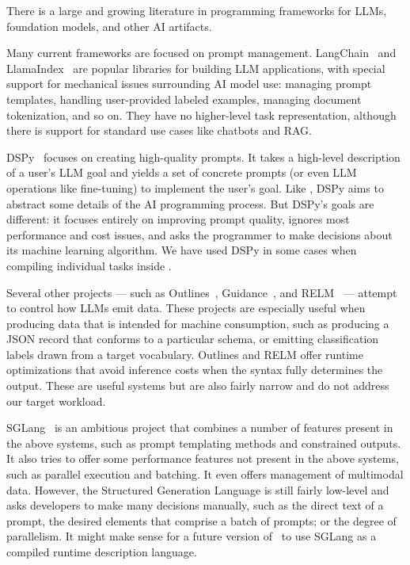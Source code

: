 There is a large and growing literature in programming frameworks for LLMs, foundation models, and other AI artifacts.

Many current frameworks are focused on prompt management. 
LangChain~\cite{langchain} and LlamaIndex~\cite{Liu_LlamaIndex_2022} are popular libraries for building LLM applications, with special support for mechanical issues surrounding AI model use: managing prompt templates, handling user-provided labeled examples, managing document tokenization, and so on. They have no higher-level task representation, although there is support for standard use cases like chatbots and RAG.

DSPy~\cite{dspy} focuses on creating high-quality prompts. It takes a high-level description of a user's LLM goal and yields a set of concrete prompts (or even LLM operations like fine-tuning) to implement the user's goal. Like \system, DSPy aims to abstract some details of the AI programming process. But DSPy's goals are different: it focuses entirely on improving prompt quality, ignores most performance and cost issues, and asks the programmer to make decisions about its machine learning algorithm.  We have used DSPy in some cases when compiling individual tasks inside \system.

Several other projects --- such as Outlines~\cite{willard2023efficient}, Guidance~\cite{guidance_ai_2023}, and RELM~\cite{kuchnik2023validating} --- attempt to control how LLMs emit data. These projects are especially useful when producing data that is intended for machine consumption, such as producing a JSON record that conforms to a particular schema, or emitting classification labels drawn from a target vocabulary. Outlines and RELM offer runtime optimizations that avoid inference costs when the syntax fully determines the output. These are useful systems but are also fairly narrow and do not address our target workload. 

SGLang~\cite{zheng2023efficiently} is an ambitious project that combines a number of features present in the above systems, such as prompt templating methods and constrained outputs. It also tries to offer some performance features not present in the above systems, such as parallel execution and batching. It even offers management of multimodal data. However, the Structured Generation Language is still fairly low-level and asks developers to make many decisions manually, such as the direct text of a prompt, the desired elements that comprise a batch of  prompts; or the degree of parallelism. It might make sense for a future version of \system\ to use SGLang as a compiled runtime description language.

